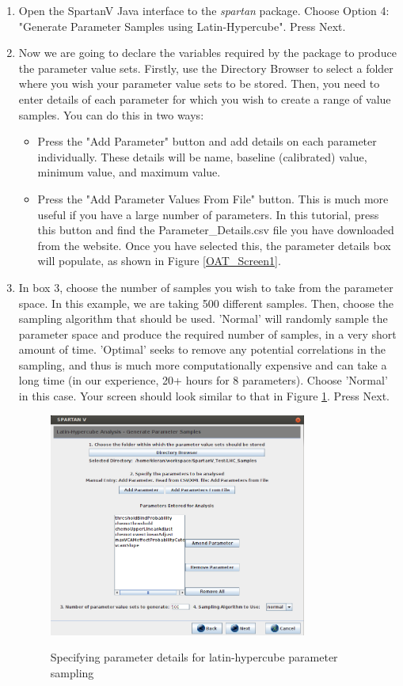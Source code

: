 \documentclass[a4paper,11pt]{article}
\begin{document}
\begin{enumerate}
\item Open the SpartanV Java interface to the \textit{spartan} package. Choose Option 4: "Generate Parameter Samples using Latin-Hypercube". Press Next.
\item Now we are going to declare the variables required by the package to produce the parameter value sets. Firstly, use the Directory Browser to select a folder where you wish your parameter value sets to be stored. Then, you need to enter details of each parameter for which you wish to create a range of value samples. You can do this in two ways:
\begin{itemize}
\item Press the "Add Parameter" button and add details on each parameter individually. These details will be name, baseline (calibrated) value, minimum value, and maximum value.
\item Press the "Add Parameter Values From File" button. This is much more useful if you have a large number of parameters. In this tutorial, press this button and find the Parameter\_Details.csv file you have downloaded from the website. Once you have selected this, the parameter details box will populate, as shown in Figure \ref{OAT_Screen1}.
\end{itemize}

\item In box 3, choose the number of samples you wish to take from the parameter space. In this example, we are taking 500 different samples. Then, choose the sampling algorithm that should be used. 'Normal' will randomly sample the parameter space and produce the required number of samples, in a very short amount of time. 'Optimal' seeks to remove any potential correlations in the sampling, and thus is much more computationally expensive and can take a long time (in our experience, 20+ hours for 8 parameters). Choose 'Normal' in this case. Your screen should look similar to that in Figure \ref{LHC_Screen1}. Press Next.

\begin{figure}
\centering
    \includegraphics[width=0.8\textwidth]{SpartanV_LHC1.png}\\ \noindent
    \caption{Specifying parameter details for latin-hypercube parameter sampling}
    \label{LHC_Screen1}
    \newpage 
\end{figure}



\end{enumerate}
\end{document}
